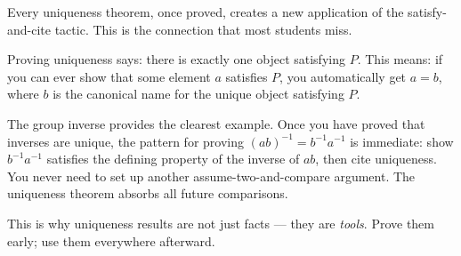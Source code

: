 \begin{remark}
Every uniqueness theorem, once proved, creates a new application of
the satisfy-and-cite tactic. This is the connection that most students
miss.

Proving uniqueness says: there is exactly one object satisfying $P$.
This means: if you can ever show that some element $a$ satisfies $P$,
you automatically get $a = b$, where $b$ is the canonical name for the
unique object satisfying $P$.

The group inverse provides the clearest example. Once you have proved
that inverses are unique, the pattern for proving $(ab)^{-1} = b^{-1}a^{-1}$
is immediate: show $b^{-1}a^{-1}$ satisfies the defining property of
the inverse of $ab$, then cite uniqueness. You never need to set up
another assume-two-and-compare argument. The uniqueness theorem absorbs
all future comparisons.

This is why uniqueness results are not just facts --- they are
\emph{tools}. Prove them early; use them everywhere afterward.
\end{remark}
